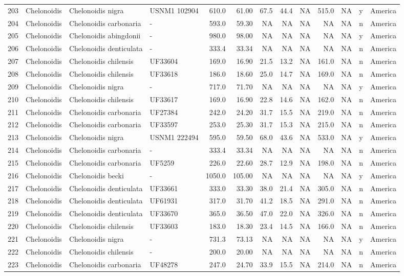\documentclass[]{article}
\begin{document}
\begin{longtable}[]{@{}llllrrrrrrlll@{}}
203 & Chelonoidis & Chelonoidis nigra & USNM1 102904 & 610.0 & 61.00 &
67.5 & 44.4 & NA & 515.0 & NA & y & America\tabularnewline
204 & Chelonoidis & Chelonoidis carbonaria & - & 593.0 & 59.30 & NA & NA
& NA & NA & NA & n & America\tabularnewline
205 & Chelonoidis & Chelonoidis abingdonii & - & 980.0 & 98.00 & NA & NA
& NA & NA & NA & y & America\tabularnewline
206 & Chelonoidis & Chelonoidis denticulata & - & 333.4 & 33.34 & NA &
NA & NA & NA & NA & n & America\tabularnewline
207 & Chelonoidis & Chelonoidis chilensis & UF33604 & 169.0 & 16.90 &
21.5 & 13.2 & NA & 161.0 & NA & n & America\tabularnewline
208 & Chelonoidis & Chelonoidis chilensis & UF33618 & 186.0 & 18.60 &
25.0 & 14.7 & NA & 169.0 & NA & n & America\tabularnewline
209 & Chelonoidis & Chelonoidis nigra & - & 717.0 & 71.70 & NA & NA & NA
& NA & NA & y & America\tabularnewline
210 & Chelonoidis & Chelonoidis chilensis & UF33617 & 169.0 & 16.90 &
22.8 & 14.6 & NA & 162.0 & NA & n & America\tabularnewline
211 & Chelonoidis & Chelonoidis carbonaria & UF27384 & 242.0 & 24.20 &
31.7 & 15.5 & NA & 219.0 & NA & n & America\tabularnewline
212 & Chelonoidis & Chelonoidis carbonaria & UF33597 & 253.0 & 25.30 &
31.7 & 15.3 & NA & 215.0 & NA & n & America\tabularnewline
213 & Chelonoidis & Chelonoidis nigra & USNM1 222494 & 595.0 & 59.50 &
68.0 & 43.6 & NA & 533.0 & NA & y & America\tabularnewline
214 & Chelonoidis & Chelonoidis carbonaria & - & 333.4 & 33.34 & NA & NA
& NA & NA & NA & n & America\tabularnewline
215 & Chelonoidis & Chelonoidis carbonaria & UF5259 & 226.0 & 22.60 &
28.7 & 12.9 & NA & 198.0 & NA & n & America\tabularnewline
216 & Chelonoidis & Chelonoidis becki & - & 1050.0 & 105.00 & NA & NA &
NA & NA & NA & y & America\tabularnewline
217 & Chelonoidis & Chelonoidis denticulata & UF33661 & 333.0 & 33.30 &
38.0 & 21.4 & NA & 305.0 & NA & n & America\tabularnewline
218 & Chelonoidis & Chelonoidis denticulata & UF61931 & 317.0 & 31.70 &
41.2 & 18.5 & NA & 291.0 & NA & n & America\tabularnewline
219 & Chelonoidis & Chelonoidis denticulata & UF33670 & 365.0 & 36.50 &
47.0 & 22.0 & NA & 326.0 & NA & n & America\tabularnewline
220 & Chelonoidis & Chelonoidis chilensis & UF33603 & 183.0 & 18.30 &
23.4 & 14.5 & NA & 166.0 & NA & n & America\tabularnewline
221 & Chelonoidis & Chelonoidis nigra & - & 731.3 & 73.13 & NA & NA & NA
& NA & NA & y & America\tabularnewline
222 & Chelonoidis & Chelonoidis chilensis & - & 200.0 & 20.00 & NA & NA
& NA & NA & NA & n & America\tabularnewline
223 & Chelonoidis & Chelonoidis carbonaria & UF48278 & 247.0 & 24.70 &
33.9 & 15.5 & NA & 214.0 & NA & n & America\tabularnewline

\end{longtable}
\end{document}
